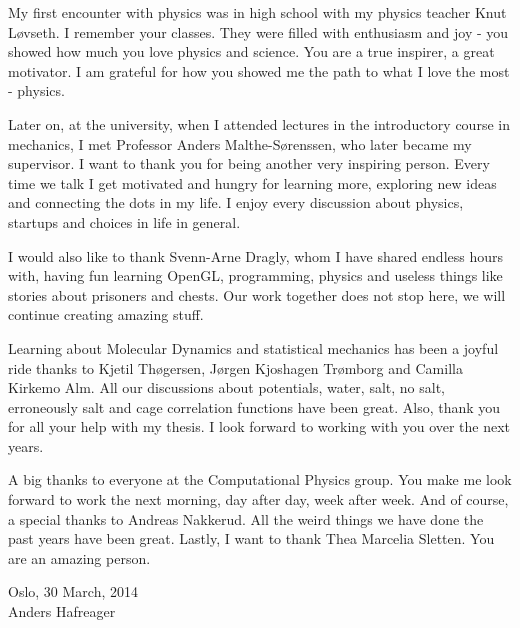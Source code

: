 My first encounter with physics was in high school with my physics teacher Knut L{\o}vseth. I remember your classes. They were filled with enthusiasm and joy - you showed how much you love physics and science. You are a true inspirer, a great motivator. I am grateful for how you showed me the path to what I love the most - physics.

Later on, at the university, when I attended lectures in the introductory course in mechanics, I met Professor Anders Malthe-S{\o}renssen, who later became my supervisor. I want to thank you for being another very inspiring person. Every time we talk I get motivated and hungry for learning more, exploring new ideas and connecting the dots in my life. I enjoy every discussion about physics, startups and choices in life in general. 

I would also like to thank Svenn-Arne Dragly, whom I have shared endless hours with, having fun learning OpenGL, programming, physics and useless things like stories about prisoners and chests. Our work together does not stop here, we will continue creating amazing stuff.

Learning about Molecular Dynamics and statistical mechanics has been a joyful ride thanks to Kjetil Th{\o}gersen, J{\o}rgen Kjoshagen Tr{\o}mborg and Camilla Kirkemo Alm. All our discussions about potentials, water, salt, no salt, erroneously salt and cage correlation functions have been great. Also, thank you for all your help with my thesis. I look forward to working with you over the next years.

A big thanks to everyone at the Computational Physics group. You make me look forward to work the next morning, day after day, week after week. And of course, a special thanks to Andreas Nakkerud. All the weird things we have done the past years have been great. Lastly, I want to thank Thea Marcelia Sletten. You are an amazing person.

\raggedleft Oslo, 30 March, 2014\\
\raggedleft Anders Hafreager